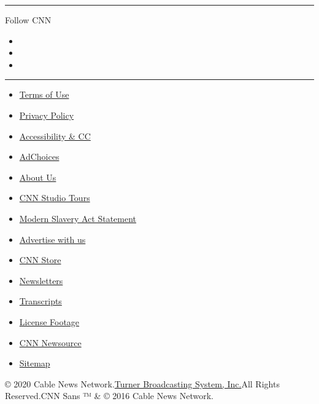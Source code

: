 \begin{center}\rule{0.5\linewidth}{\linethickness}\end{center}

Follow CNN

\begin{itemize}
\item
\item
\item
\end{itemize}

\begin{center}\rule{0.5\linewidth}{\linethickness}\end{center}

\begin{itemize}
\tightlist
\item
  \href{/terms}{Terms of Use}
\item
  \href{/privacy}{Privacy Policy}
\item
  \href{/accessibility}{Accessibility \& CC}
\item
  \protect\hyperlink{}{AdChoices}
\item
  \href{/about}{About Us}
\item
  \href{/tour}{CNN Studio Tours}
\item
  \href{/msa}{Modern Slavery Act Statement}
\item
  \href{https://commercial.cnn.com}{Advertise with us}
\item
  \href{//store.cnn.com}{CNN Store}
\item
  \href{/newsletters}{Newsletters}
\item
  \href{/transcripts}{Transcripts}
\item
  \href{/collection}{License Footage}
\item
  \href{http://cnnnewsource.com}{CNN Newsource}
\item
  \href{https://www.cnn.com/sitemap.html}{Sitemap}
\end{itemize}

© 2020 Cable News Network.\href{//www.turner.com}{Turner Broadcasting
System, Inc.}All Rights Reserved.CNN Sans ™ \& © 2016 Cable News
Network.
